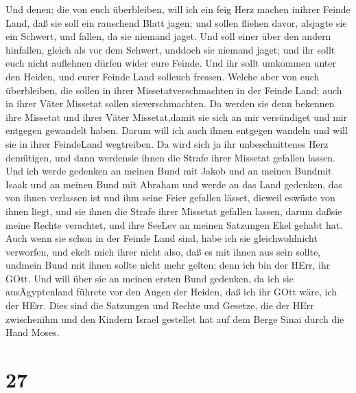 Und denen; die von euch überbleiben, will ich ein feig Herz machen
inihrer Feinde Land, daß sie soll ein rauschend Blatt jagen; und sollen
fliehen davor, alsjagte sie ein Schwert, und fallen, da sie niemand
jaget.  Und soll einer über den andern hinfallen, gleich
als vor dem Schwert, unddoch sie niemand jaget; und ihr sollt euch nicht
auflehnen dürfen wider eure Feinde.  Und ihr sollt umkommen
unter den Heiden, und eurer Feinde Land solleuch fressen. 
Welche aber von euch überbleiben, die sollen in ihrer
Missetatverschmachten in der Feinde Land; auch in ihrer Väter Missetat
sollen sieverschmachten.  Da werden sie denn bekennen ihre
Missetat und ihrer Väter Missetat,damit sie sich an mir versündiget und
mir entgegen gewandelt haben.  Darum will ich auch ihnen
entgegen wandeln und will sie in ihrer FeindeLand wegtreiben. Da wird
sich ja ihr unbeschnittenes Herz demütigen, und dann werdensie ihnen die
Strafe ihrer Missetat gefallen lassen.  Und ich werde
gedenken an meinen Bund mit Jakob und an meinen Bundmit Isaak und an
meinen Bund mit Abraham und werde an das Land gedenken, 
das von ihnen verlassen ist und ihm seine Feier gefallen lässet, dieweil
eswüste von ihnen liegt, und sie ihnen die Strafe ihrer Missetat
gefallen lassen, darum daßsie meine Rechte verachtet, und ihre SeeLev an
meinen Satzungen Ekel gehabt hat.  Auch wenn sie schon in
der Feinde Land sind, habe ich sie gleichwohlnicht verworfen, und ekelt
mich ihrer nicht also, daß es mit ihnen aus sein sollte, undmein Bund
mit ihnen sollte nicht mehr gelten; denn ich bin der HErr, ihr GOtt.
 Und will über sie an meinen ersten Bund gedenken, da ich
sie ausÄgyptenland führete vor den Augen der Heiden, daß ich ihr GOtt
wäre, ich der HErr.  Dies sind die Satzungen und Rechte und
Gesetze, die der HErr zwischenihm und den Kindern Israel gestellet hat
auf dem Berge Sinai durch die Hand Moses.

\hypertarget{section-26}{%
\section{27}\label{section-26}}


